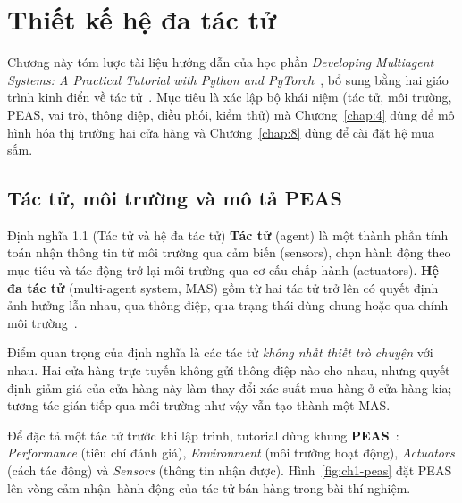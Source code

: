 \chapter{Thiết kế hệ đa tác tử}\label{chap:1}

Chương này tóm lược tài liệu hướng dẫn của học phần \emph{Developing Multiagent Systems: A Practical Tutorial
with Python and PyTorch}~\cite{ch1:tutorial}, bổ sung bằng hai giáo trình kinh điển về tác tử~\cite{ch1:wooldridge,ch1:russell}.
Mục tiêu là xác lập bộ khái niệm (tác tử, môi trường, PEAS, vai trò, thông điệp, điều phối, kiểm thử) mà
Chương~\ref{chap:4} dùng để mô hình hóa thị trường hai cửa hàng và Chương~\ref{chap:8} dùng để cài đặt hệ mua sắm.

\section{Tác tử, môi trường và mô tả PEAS}

\begin{dinhnghia}{Định nghĩa 1.1 (Tác tử và hệ đa tác tử)}
\textbf{Tác tử} (agent) là một thành phần tính toán nhận thông tin từ môi trường qua cảm biến (sensors), chọn
hành động theo mục tiêu và tác động trở lại môi trường qua cơ cấu chấp hành (actuators). \textbf{Hệ đa tác tử}
(multi-agent system, MAS) gồm từ hai tác tử trở lên có quyết định ảnh hưởng lẫn nhau, qua thông điệp, qua trạng
thái dùng chung hoặc qua chính môi trường~\cite{ch1:wooldridge}.
\end{dinhnghia}

Điểm quan trọng của định nghĩa là các tác tử \emph{không nhất thiết trò chuyện} với nhau. Hai cửa hàng trực tuyến
không gửi thông điệp nào cho nhau, nhưng quyết định giảm giá của cửa hàng này làm thay đổi xác suất mua hàng ở
cửa hàng kia; tương tác gián tiếp qua môi trường như vậy vẫn tạo thành một MAS.

Để đặc tả một tác tử trước khi lập trình, tutorial dùng khung \textbf{PEAS}~\cite{ch1:russell}:
\emph{Performance} (tiêu chí đánh giá), \emph{Environment} (môi trường hoạt động), \emph{Actuators} (cách tác động)
và \emph{Sensors} (thông tin nhận được). Hình~\ref{fig:ch1-peas} đặt PEAS lên vòng cảm nhận--hành động của tác tử
bán hàng trong bài thí nghiệm.



